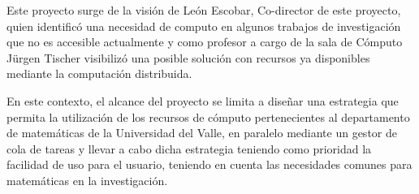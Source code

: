 \begin{doublespace}
  Este proyecto surge de la visión de León Escobar, Co-director de este proyecto, quien identificó una necesidad de computo en algunos trabajos de investigación que no es accesible actualmente y como profesor a cargo de la sala de Cómputo Jürgen Tischer visibilizó una posible solución con recursos ya disponibles mediante la computación distribuida.

  \vspace{3mm}

  En este contexto, el alcance del proyecto se limita a diseñar una estrategia que permita la utilización de los recursos de cómputo pertenecientes al departamento de matemáticas de la Universidad del Valle, en paralelo mediante un gestor de cola de tareas y llevar a cabo dicha estrategia teniendo como prioridad la facilidad de uso para el usuario, teniendo en cuenta las necesidades comunes para matemáticas en la investigación.


  \mylinespacing
  \mylinespacing
  \begin{tightcenter}
  \end{tightcenter}
\end{doublespace}
